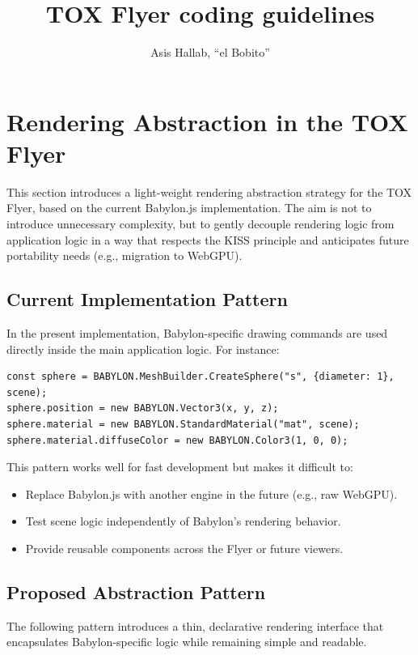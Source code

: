 \documentclass{article}
\title{TOX Flyer coding guidelines}
\author{Asis Hallab, ``el Bobito''}
\begin{document}
\maketitle

\section{Rendering Abstraction in the TOX Flyer}

This section introduces a light-weight rendering abstraction strategy for the TOX Flyer, based on the current Babylon.js implementation. The aim is not to introduce unnecessary complexity, but to gently decouple rendering logic from application logic in a way that respects the KISS principle and anticipates future portability needs (e.g., migration to WebGPU).

\subsection{Current Implementation Pattern}

In the present implementation, Babylon-specific drawing commands are used directly inside the main application logic. For instance:

\begin{verbatim}
const sphere = BABYLON.MeshBuilder.CreateSphere("s", {diameter: 1}, scene);
sphere.position = new BABYLON.Vector3(x, y, z);
sphere.material = new BABYLON.StandardMaterial("mat", scene);
sphere.material.diffuseColor = new BABYLON.Color3(1, 0, 0);
\end{verbatim}

This pattern works well for fast development but makes it difficult to:
\begin{itemize}
  \item Replace Babylon.js with another engine in the future (e.g., raw WebGPU).
  \item Test scene logic independently of Babylon’s rendering behavior.
  \item Provide reusable components across the Flyer or future viewers.
\end{itemize}

\subsection{Proposed Abstraction Pattern}

The following pattern introduces a thin, declarative rendering interface that encapsulates Babylon-specific logic while remaining simple and readable.
\end{document}
